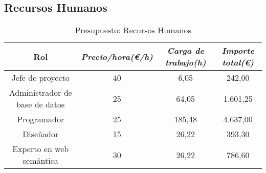 \subsection{Recursos Humanos}

\begin{table}[htp]
	\centering
	\caption{Presupuesto: Recursos Humanos}\label{tab:budget-human}
	\begin{tabular}{cccc}
		\toprule
    	\textbf{Rol} & \emph{Precio/hora(\euro/h)} & \emph{Carga de trabajo(h)} & \emph{Importe total(\euro)}\\
    	\midrule
    	Jefe de proyecto				&	40			&	6,05 					& 	242,00\\
		Administrador de base de datos	&	25			&	64,05					&	1.601,25\\
		Programador						&	25			&	185,48					&	4.637,00\\
		Diseñador						&	15			&	26,22					&	393,30\\
		Experto en web semántica		&	30			&	26,22					&	786,60\\
    	\bottomrule
    \end{tabular}
\end{table}